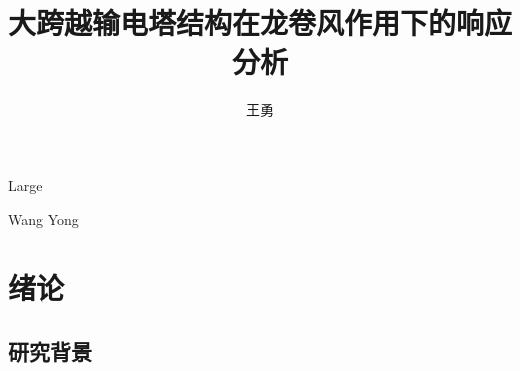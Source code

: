 \documentclass[algorithmlist,figurelist,tablelist,nomlist,masters]{seuthesix}
\begin{document}
\title{大跨越输电塔结构在龙卷风作用下的响应分析}{}{Large}{}
\author{王勇}{Wang Yong}
\authorizedate{\today}
\committeechair{}
\reviewer{}{}

\makebigcover
\makecover

\begin{abstract}{}
\end{abstract}

\begin{englishabstract}{}
\end{englishabstract}

\tableofcontents

\mainmatter

\chapter{绪论}
\section{研究背景}
\end{document}
